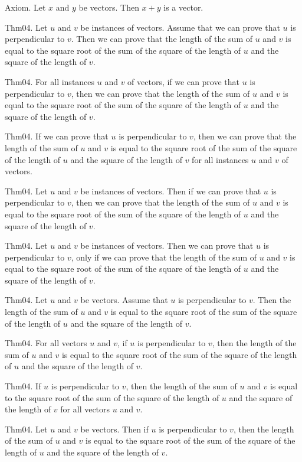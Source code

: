 \documentclass{article}
\begin{document}
Axiom. Let $x$ and $y$ be vectors. Then $x + y$ is a vector.

Thm04. Let $u$ and $v$ be instances of vectors. Assume that we can prove that $u$ is perpendicular to $v$. Then we can prove that the length of the sum of $u$ and $v$ is equal to the square root of the sum of the square of the length of $u$ and the square of the length of $v$.

Thm04. For all instances $u$ and $v$ of vectors, if we can prove that $u$ is perpendicular to $v$, then we can prove that the length of the sum of $u$ and $v$ is equal to the square root of the sum of the square of the length of $u$ and the square of the length of $v$.

Thm04. If we can prove that $u$ is perpendicular to $v$, then we can prove that the length of the sum of $u$ and $v$ is equal to the square root of the sum of the square of the length of $u$ and the square of the length of $v$ for all instances $u$ and $v$ of vectors.

Thm04. Let $u$ and $v$ be instances of vectors. Then if we can prove that $u$ is perpendicular to $v$, then we can prove that the length of the sum of $u$ and $v$ is equal to the square root of the sum of the square of the length of $u$ and the square of the length of $v$.

Thm04. Let $u$ and $v$ be instances of vectors. Then we can prove that $u$ is perpendicular to $v$, only if we can prove that the length of the sum of $u$ and $v$ is equal to the square root of the sum of the square of the length of $u$ and the square of the length of $v$.

Thm04. Let $u$ and $v$ be vectors. Assume that $u$ is perpendicular to $v$. Then the length of the sum of $u$ and $v$ is equal to the square root of the sum of the square of the length of $u$ and the square of the length of $v$.

Thm04. For all vectors $u$ and $v$, if $u$ is perpendicular to $v$, then the length of the sum of $u$ and $v$ is equal to the square root of the sum of the square of the length of $u$ and the square of the length of $v$.

Thm04. If $u$ is perpendicular to $v$, then the length of the sum of $u$ and $v$ is equal to the square root of the sum of the square of the length of $u$ and the square of the length of $v$ for all vectors $u$ and $v$.

Thm04. Let $u$ and $v$ be vectors. Then if $u$ is perpendicular to $v$, then the length of the sum of $u$ and $v$ is equal to the square root of the sum of the square of the length of $u$ and the square of the length of $v$.
\end{document}
